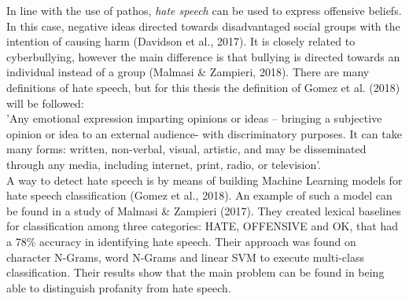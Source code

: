 \documentclass[a4paper,pdf]{article} %
\begin{document}
In line with the use of pathos, \emph{hate speech} can be used to express offensive beliefs. In this case, negative ideas directed towards disadvantaged social groups with the intention of causing harm (Davidson et al., 2017). It is closely related to cyberbullying, however the main difference is that bullying is directed towards an individual instead of a group (Malmasi \& Zampieri, 2018). There are many definitions of hate speech, but for this thesis the definition of Gomez et al. (2018) will be followed: \\

'Any emotional expression imparting opinions or
ideas – bringing a subjective opinion or idea to an
external audience- with discriminatory purposes. It
can take many forms: written, non-verbal, visual,
artistic, and may be disseminated through any media,
including internet, print, radio, or television'. \\

A way to detect hate speech is by means of building Machine Learning models for hate speech classification (Gomez et al., 2018). An example of such a model can be found in a study of Malmasi \& Zampieri (2017). They created lexical baselines for classification among three categories: HATE, OFFENSIVE and OK, that had a 78\% accuracy in identifying hate speech. Their approach was found on character N-Grams, word N-Grams and linear SVM to execute multi-class classification. Their results show that the main problem can be found in being able to distinguish profanity from hate speech. 


\end{document}
